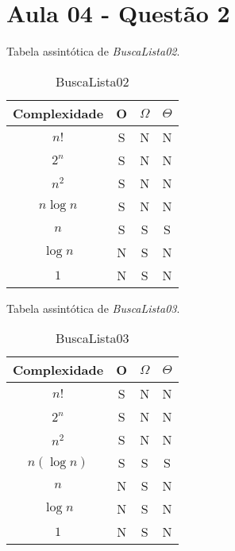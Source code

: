 \section{Aula 04 - Questão 2}

Tabela assintótica de \textit{BuscaLista02}. 

\begin{table}[ht!]
    \centering
    \begin{tabular}{|c|c|c|c|}
    \hline
    \textbf{Complexidade} & \textbf{O} & $\Omega$ & $\Theta$ \\ \hline
    $n!$ & S & N & N \\ \hline
    $2^n$ & S & N & N \\ \hline
    $n^2$ & S & N & N \\ \hline
    $n\log n$ & S & N & N \\ \hline
    $n$ & S & S & S \\ \hline
    $\log n$ & N & S & N \\ \hline
    $1$ & N & S & N \\ \hline 
    \end{tabular}
    \caption{BuscaLista02}
\end{table}

Tabela assintótica de \textit{BuscaLista03}. 

\begin{table}[ht!]
    \centering
    \begin{tabular}{|c|c|c|c|}
    \hline
    \textbf{Complexidade} & \textbf{O} & $\Omega$ & $\Theta$ \\ \hline
    $n!$ & S & N & N \\ \hline
    $2^n$ & S & N & N \\ \hline
    $n^2$ & S & N & N \\ \hline
    $n(\log n)$ & S & S & S \\ \hline
    $n$ & N & S & N \\ \hline
    $\log n$ & N & S & N \\ \hline
    $1$ & N & S & N \\ \hline 
    \end{tabular}
    \caption{BuscaLista03}
\end{table}
